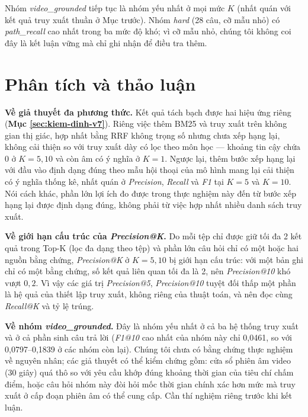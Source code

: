 \bigbreak\noindent
Nhóm \textit{video\_grounded} tiếp tục là nhóm yếu nhất ở mọi mức $K$ (nhất quán với kết quả truy xuất thuần ở Mục trước). Nhóm \textit{hard} (28 câu, cỡ mẫu nhỏ) có \textit{path\_recall} cao nhất trong ba mức độ khó; vì cỡ mẫu nhỏ, chúng tôi không coi đây là kết luận vững mà chỉ ghi nhận để điều tra thêm.


\section{Phân tích và thảo luận}\label{sec:thao-luan}

\textbf{Về giả thuyết đa phương thức.} Kết quả tách bạch được hai hiệu ứng riêng (\textbf{Mục \ref{sec:kiem-dinh-v7}}). Riêng việc thêm BM25 và truy xuất trên không gian thị giác, hợp nhất bằng RRF không trọng số nhưng chưa xếp hạng lại, không cải thiện so với truy xuất dày có lọc theo môn học — khoảng tin cậy chứa 0 ở $K = 5, 10$ và còn âm có ý nghĩa ở $K = 1$. Ngược lại, thêm bước xếp hạng lại với đầu vào định dạng đúng theo mẫu hội thoại của mô hình mang lại cải thiện có ý nghĩa thống kê, nhất quán ở \textit{Precision}, \textit{Recall} và \textit{F1} tại $K = 5$ và $K = 10$. Nói cách khác, phần lớn lợi ích đo được trong thực nghiệm này đến từ bước xếp hạng lại được định dạng đúng, không phải từ việc hợp nhất nhiều danh sách truy xuất.

\bigbreak\noindent
\textbf{Về giới hạn cấu trúc của \textit{Precision@K}.} Do mỗi tệp chỉ được giữ tối đa 2 kết quả trong Top-K (lọc đa dạng theo tệp) và phần lớn câu hỏi chỉ có một hoặc hai nguồn bằng chứng, \textit{Precision@K} ở $K = 5, 10$ bị giới hạn cấu trúc: với một bản ghi chỉ có một bằng chứng, số kết quả liên quan tối đa là 2, nên \textit{Precision@10} khó vượt $0{,}2$. Vì vậy các giá trị \textit{Precision@5}, \textit{Precision@10} tuyệt đối thấp một phần là hệ quả của thiết lập truy xuất, không riêng của thuật toán, và nên đọc cùng \textit{Recall@K} và tỷ lệ trúng.

\bigbreak\noindent
\textbf{Về nhóm \textit{video\_grounded}.} Đây là nhóm yếu nhất ở cả ba hệ thống truy xuất và ở cả phần sinh câu trả lời (\textit{F1@10} cao nhất của nhóm này chỉ 0,0461, so với 0,0797–0,1839 ở các nhóm còn lại). Chúng tôi chưa có bằng chứng thực nghiệm về nguyên nhân; các giả thuyết có thể kiểm chứng gồm: cửa sổ phiên âm video (30 giây) quá thô so với yêu cầu khớp đúng khoảng thời gian của tiêu chí chấm điểm, hoặc câu hỏi nhóm này đòi hỏi mốc thời gian chính xác hơn mức mà truy xuất ở cấp đoạn phiên âm có thể cung cấp. Cần thí nghiệm riêng trước khi kết luận.

